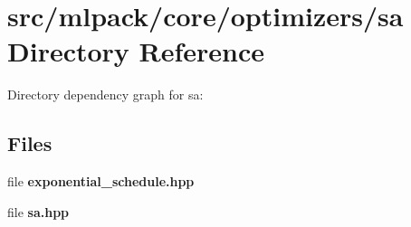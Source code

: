 \section{src/mlpack/core/optimizers/sa Directory Reference}
\label{dir_c28fe4844ed6b7b9db8994d661f50b2e}
Directory dependency graph for sa\-:
\subsection*{Files}
\begin{DoxyCompactItemize}
\item 
file {\bf exponential\-\_\-schedule.\-hpp}
\item 
file {\bf sa.\-hpp}
\end{DoxyCompactItemize}
